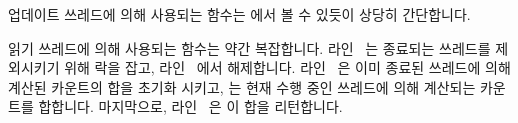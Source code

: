 \begin{fcvref}
업데이트 쓰레드에 의해 사용되는  함수는  에서
볼 수 있듯이 상당히 간단합니다.
\end{fcvref}

\begin{fcvref}
읽기 쓰레드에 의해 사용되는  함수는 약간 복잡합니다.
라인~ 는 종료되는 쓰레드를 제외시키기 위해 락을 잡고,
라인~ 에서 해제합니다.
라인~ 은 이미 종료된 쓰레드에 의해 계산된 카운트의 합을 초기화
시키고,  는 현재 수행 중인 쓰레드에 의해 계산되는
카운트를 합합니다.
마지막으로, 라인~ 은 이 합을 리턴합니다.
\end{fcvref}

